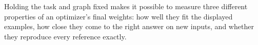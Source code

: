 Holding the task and graph fixed makes it possible to measure three different properties of an optimizer's final weights: how well they fit the displayed examples, how close they come to the right answer on new inputs, and whether they reproduce every reference exactly. 
